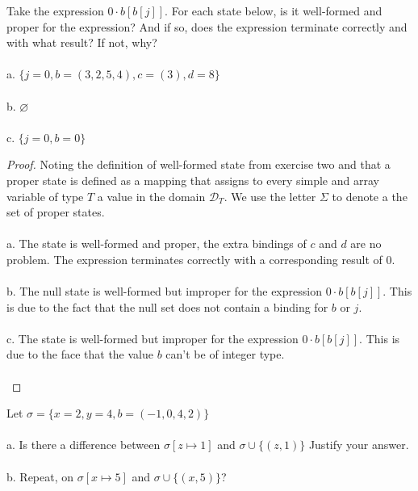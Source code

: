 \documentclass[12pt]{article}
\newenvironment{exercise}[2][Exercise]{\begin{trivlist}
\item[\hskip \labelsep {\bfseries #1}\hskip \labelsep {\bfseries #2.}]}{\end{trivlist}}
\begin{document}
\begin{exercise}{5}
Take the expression $0 \cdot b[b[j]]$. For each state below, is it well-formed and proper for the expression? And if so, does the expression terminate correctly and with what result? If not, why? \\ \\ 
a. $\{j = 0, b = (3,2,5,4), c = (3), d=8\}$ \\ \\ 
b. $\varnothing$ \\ \\
c. $\{ j = 0, b = 0\}$
\end{exercise}

\begin{proof} 
Noting the definition of well-formed state from exercise two and that a proper state is defined as a mapping that assigns to every simple and array variable of type $T$ a value in the domain $\mathcal{D}_{T}$. We use the letter $\Sigma$ to denote a the set of proper states. \\ \\ 
a. The state is well-formed and proper, the extra bindings of $c$ and $d$ are no problem. The expression terminates correctly with a corresponding result of $0$. \\ \\
b. The null state is well-formed but improper for the expression $0 \cdot b[b[j]]$. This is due to the fact that the null set does not contain a binding for $b$ or $j$. \\ \\ 
c. The state is well-formed but improper for the expression $0 \cdot b[b[j]]$. This is due to the face that the value $b$ can't be of integer type. \\ \\
\end{proof}

\begin{exercise}{6}
Let $\sigma = \{x = 2, y = 4, b = (-1, 0, 4, 2)\}$ \\ \\ 
a. Is there a difference between $\sigma [z \mapsto 1]$ and $\sigma \cup \{(z, 1)\}$ Justify your answer. \\ \\ 
b. Repeat, on $\sigma [x \mapsto 5]$ and $\sigma \cup \{(x, 5)\}$?
\end{exercise}
\end{document}
